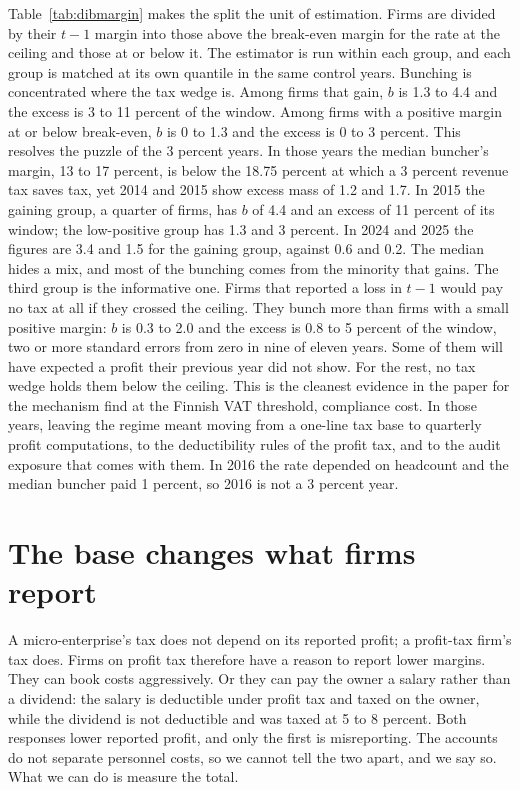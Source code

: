 \documentclass[12pt]{article}
\begin{document}
Table~\ref{tab:dibmargin} makes the split the unit of estimation. Firms are divided by their $t-1$ margin into those above the break-even margin for the rate at the ceiling and those at or below it. The estimator is run within each group, and each group is matched at its own quantile in the same control years. Bunching is concentrated where the tax wedge is. Among firms that gain, $b$ is 1.3 to 4.4 and the excess is 3 to 11 percent of the window. Among firms with a positive margin at or below break-even, $b$ is 0 to 1.3 and the excess is 0 to 3 percent. This resolves the puzzle of the 3 percent years. In those years the median buncher's margin, 13 to 17 percent, is below the 18.75 percent at which a 3 percent revenue tax saves tax, yet 2014 and 2015 show excess mass of 1.2 and 1.7. In 2015 the gaining group, a quarter of firms, has $b$ of 4.4 and an excess of 11 percent of its window; the low-positive group has 1.3 and 3 percent. In 2024 and 2025 the figures are 3.4 and 1.5 for the gaining group, against 0.6 and 0.2. The median hides a mix, and most of the bunching comes from the minority that gains. The third group is the informative one. Firms that reported a loss in $t-1$ would pay no tax at all if they crossed the ceiling. They bunch more than firms with a small positive margin: $b$ is 0.3 to 2.0 and the excess is 0.8 to 5 percent of the window, two or more standard errors from zero in nine of eleven years. Some of them will have expected a profit their previous year did not show. For the rest, no tax wedge holds them below the ceiling. This is the cleanest evidence in the paper for the mechanism \citet{harju2019vat} find at the Finnish VAT threshold, compliance cost. In those years, leaving the regime meant moving from a one-line tax base to quarterly profit computations, to the deductibility rules of the profit tax, and to the audit exposure that comes with them. In 2016 the rate depended on headcount and the median buncher paid 1 percent, so 2016 is not a 3 percent year.





\FloatBarrier
\section{The base changes what firms report}\label{sec:base}

A micro-enterprise's tax does not depend on its reported profit; a profit-tax firm's tax does. Firms on profit tax therefore have a reason to report lower margins. They can book costs aggressively. Or they can pay the owner a salary rather than a dividend: the salary is deductible under profit tax and taxed on the owner, while the dividend is not deductible and was taxed at 5 to 8 percent. Both responses lower reported profit, and only the first is misreporting. The accounts do not separate personnel costs, so we cannot tell the two apart, and we say so. What we can do is measure the total.
\end{document}
